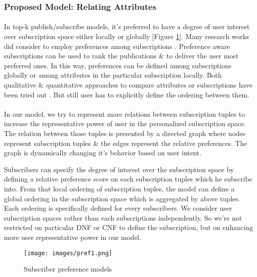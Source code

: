 \documentclass[a4paper,12pt,oneside]{book}
\theoremstyle{definition}
\theoremstyle{remark}
\begin{document}
\subsubsection{Proposed Model: Relating Attributes}
\label{sec:relatingatt}
\paragraph*{}
In top-k publish/subscribe models, it's preferred to have a degree of user interest over subscription space either locally or globally [Figure \ref{subscriber_preference_models}]. Many research works did consider to employ preferences among subscriptions \cite{Drosou2008, Drosou2009, Drosou2009workshopp}. Preference aware subscriptions can be used to rank the publications \& to deliver the user most preferred ones. In this way, preferences can be defined among subscriptions globally or among attributes in the particular subscription locally. Both qualitative \& quantitative approaches to compare attributes or subscriptions have been tried out \cite{Drosou2009workshopp}. But still user has to explicitly define the ordering between them.

\paragraph*{}
In our model, we try to represent more relations between subscription tuples to increase the representative power of user in the personalized subscription space. The relation between those tuples is presented by a directed graph where nodes represent subscription tuples \& the edges represent the relative preferences. The graph is dynamically changing it's behavior based on user intent. 

Subscribers can specify the degree of interest over the subscription space by defining a relative preference score on each subscription tuples which he subscribe into. From that local ordering of subscription tuples, the model can define a global ordering in the subscription space which is aggregated by above tuples. Each ordering is specifically defined for every subscribers. We consider user subscription spaces rather than each subscriptions independently. So we're not restricted on particular \ac{DNF} or \ac{CNF} to define the subscription, but on enhancing more user representative power in our model.

\begin{figure}[h]
\begin{center}
\texttt{[image: images/pref1.png]}
\caption{Subscriber preference models}
\label{subscriber_preference_models}
\end{center}
\end{figure}
\end{document}
